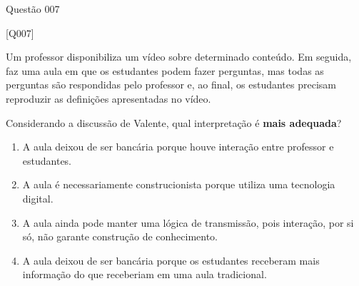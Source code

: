 \documentclass[xcolor=dvipsnames,table]{beamer}
\begin{document}
    \begin{frame}{Questão 007}

		\small

    \begin{block}{[Q007]}
    
    Um professor disponibiliza um vídeo sobre determinado conteúdo. Em seguida, faz uma aula em que os estudantes podem fazer perguntas, mas todas as perguntas são respondidas pelo professor e, ao final, os estudantes precisam reproduzir as definições apresentadas no vídeo.

    Considerando a discussão de Valente, qual interpretação é \textbf{mais adequada}?

    \end{block}

    \begin{enumerate}[label=(\Alph*)]

        \item A aula deixou de ser bancária porque houve interação entre professor e estudantes.
        
		\item A aula é necessariamente construcionista porque utiliza uma tecnologia digital.

        \item A aula ainda pode manter uma lógica de transmissão, pois interação, por si só, não garante construção de conhecimento.

        \item A aula deixou de ser bancária porque os estudantes receberam mais informação do que receberiam em uma aula tradicional.

    \end{enumerate}

\end{frame}
\end{document}
